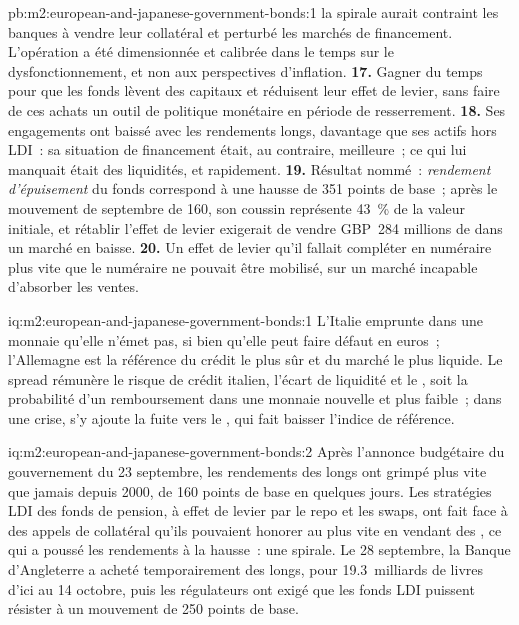 \begin{solution}{pb:m2:european-and-japanese-government-bonds:1}
la spirale aurait contraint les banques à vendre leur collatéral et perturbé
les marchés de financement. L'opération a été dimensionnée et calibrée dans le temps sur le dysfonctionnement, et non
aux perspectives d'inflation.
\textbf{17.} Gagner du temps pour que les fonds lèvent des capitaux et réduisent leur effet de levier,
sans faire de ces achats un outil de politique monétaire en période de resserrement.
\textbf{18.} Ses engagements ont baissé avec les rendements longs, davantage que ses
actifs hors LDI~: sa situation de financement était, au contraire, meilleure~; ce qui lui manquait était
des liquidités, et rapidement.
\textbf{19.} Résultat nommé~: \emph{rendement d'épuisement} du fonds correspond à une hausse de 351
points de base~; après le mouvement de septembre de 160, son coussin représente 43~\% de la
valeur initiale, et rétablir l'effet de levier exigerait de vendre GBP~284 millions de
 dans un marché en baisse.
\textbf{20.} Un effet de levier qu'il fallait compléter en numéraire plus vite que le numéraire
ne pouvait être mobilisé, sur un marché incapable d'absorber les ventes.
\end{solution}

\begin{solution}{iq:m2:european-and-japanese-government-bonds:1}
L'Italie emprunte dans une monnaie qu'elle n'émet pas, si bien qu'elle peut faire défaut en euros~;
l'Allemagne est la référence du crédit le plus sûr et du marché le plus liquide. Le
spread rémunère le risque de crédit italien, l'écart de liquidité et
le , soit la probabilité d'un remboursement dans une monnaie nouvelle et plus faible~; dans une
crise, s'y ajoute la fuite vers le , qui fait baisser l'indice de référence.
\end{solution}

\begin{solution}{iq:m2:european-and-japanese-government-bonds:2}
Après l'annonce budgétaire du gouvernement du 23 septembre, les rendements des  longs
ont grimpé plus vite que jamais depuis 2000, de 160 points de base en quelques jours.
Les stratégies LDI des fonds de pension, à effet de levier par le repo et les swaps, ont fait
face à des appels de collatéral qu'ils pouvaient honorer au plus vite en vendant des , ce qui a poussé les rendements
à la hausse~: une spirale. Le 28 septembre, la Banque d'Angleterre a acheté temporairement des  longs,
pour 19.3~milliards de livres d'ici au 14 octobre, puis les régulateurs ont exigé que
les fonds LDI puissent résister à un mouvement de 250 points de base.
\end{solution}


